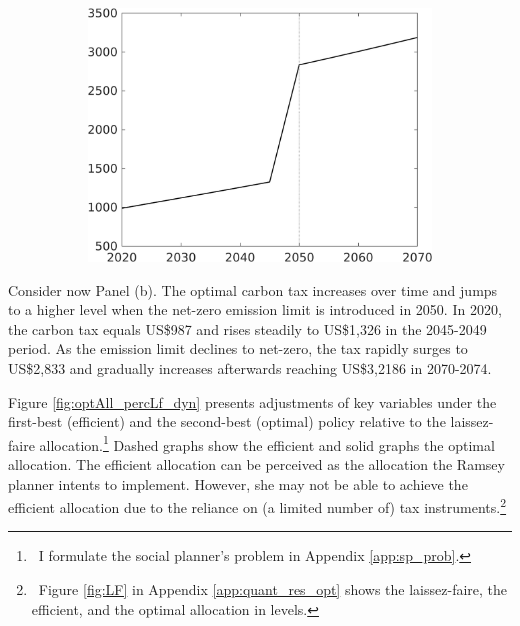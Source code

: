 \begin{figure}[h!!]
\begin{subfigure}{0.4\textwidth}
		\includegraphics[width=1\textwidth]{../../codding_model/own_basedOnFried/optimalPol_010922_revision/figures/all_13Sept22_Tplus30/Single_periods12_OPT_T_NoTaus_Tauf_regime4_spillover0_knspil0_noskill0_sep0_xgrowth0_extern0_PV1_sizeequ0_GOV0_etaa0.79.png}
	\end{subfigure}
\end{figure} 
Consider now Panel (b). The optimal carbon tax increases over time and jumps to a higher level when the net-zero emission limit is introduced in 2050.
In 2020, the carbon tax equals US\$987 and rises steadily to US\$1,326 in the 2045-2049 period.  As the emission limit declines to net-zero, the tax rapidly surges to US\$2,833 and gradually increases afterwards reaching US\$3,2186 in 2070-2074. 

Figure \ref{fig:optAll_percLf_dyn} presents adjustments of key variables under the first-best (efficient) and the second-best (optimal) policy relative to the laissez-faire allocation.\footnote{\ I formulate the social planner's problem in Appendix \ref{app:sp_prob}. }  Dashed graphs show the efficient and solid graphs the optimal allocation.
The efficient allocation can be perceived as the allocation the Ramsey planner intents to implement. However, she may not be able to achieve the efficient allocation due to the reliance on (a limited number of) tax instruments.\footnote{\ Figure \ref{fig:LF} in Appendix \ref{app:quant_res_opt}  shows the laissez-faire, the efficient, and the optimal allocation in levels.}

